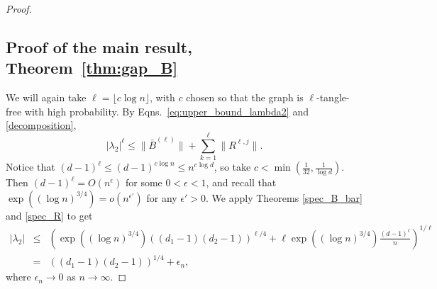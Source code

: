 \begin{proof}
\subsection{Proof of the main result, Theorem~\ref{thm:gap_B}}
We will again take $\ell = \lfloor c \log n \rfloor$, with $c$ chosen so that the
graph is $\ell$-tangle-free 
with high probability.
By Eqns.~\eqref{eq:upper_bound_lambda2} and \eqref{decomposition},
\[
|\lambda_2|^{\ell}\leq \| \bar{B}^{(\ell)}\|+
\sum_{k=1}^{\ell} \| R^{\ell,j}\|.
\]
Notice that
$
(d-1)^\ell \leq (d-1)^{c \log n} \leq  n^{c \log d}
$,
so take 
$c < \min \left(\frac{1}{32}, \frac{1}{\log d} \right)$.
Then $(d-1)^\ell = O(n^\epsilon)$ for some $0 < \epsilon < 1$,
and recall that 
$\exp((\log n)^{3/4}) = o(n^{\epsilon'})$ for any 
$\epsilon' > 0$.
We apply
Theorems \ref{spec_B_bar} and \ref{spec_R} to get
\begin{eqnarray}
\nonumber
|\lambda_2| 
& \leq & 
\left(
\exp((\log n)^{3/4}) \left( (d_1-1)(d_2-1) \right)^{\ell/4} 
+ 
\ell 
\exp((\log n)^{3/4})
\frac{(d-1)^\ell}{n}
\right)^{1/\ell} \\
\nonumber
& = & \left( (d_1-1)(d_2-1) \right)^{1/4}+\epsilon_n,
\end{eqnarray}
where $\epsilon_n \to 0$ as $n \to \infty$.
\end{proof}
